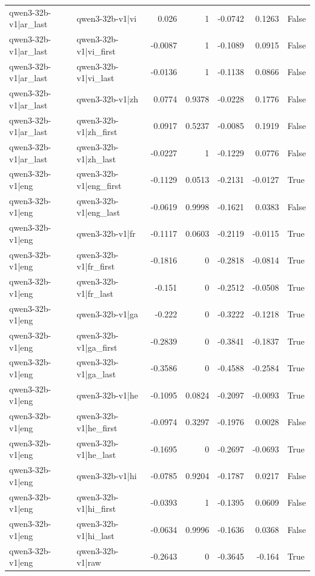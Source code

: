 \begin{table}
\begin{tabular}{l l r r r r l}
qwen3-32b-v1|ar_last & qwen3-32b-v1|vi & 0.026 & 1 & -0.0742 & 0.1263 & False \\
qwen3-32b-v1|ar_last & qwen3-32b-v1|vi_first & -0.0087 & 1 & -0.1089 & 0.0915 & False \\
qwen3-32b-v1|ar_last & qwen3-32b-v1|vi_last & -0.0136 & 1 & -0.1138 & 0.0866 & False \\
qwen3-32b-v1|ar_last & qwen3-32b-v1|zh & 0.0774 & 0.9378 & -0.0228 & 0.1776 & False \\
qwen3-32b-v1|ar_last & qwen3-32b-v1|zh_first & 0.0917 & 0.5237 & -0.0085 & 0.1919 & False \\
qwen3-32b-v1|ar_last & qwen3-32b-v1|zh_last & -0.0227 & 1 & -0.1229 & 0.0776 & False \\
qwen3-32b-v1|eng & qwen3-32b-v1|eng_first & -0.1129 & 0.0513 & -0.2131 & -0.0127 & True \\
qwen3-32b-v1|eng & qwen3-32b-v1|eng_last & -0.0619 & 0.9998 & -0.1621 & 0.0383 & False \\
qwen3-32b-v1|eng & qwen3-32b-v1|fr & -0.1117 & 0.0603 & -0.2119 & -0.0115 & True \\
qwen3-32b-v1|eng & qwen3-32b-v1|fr_first & -0.1816 & 0 & -0.2818 & -0.0814 & True \\
qwen3-32b-v1|eng & qwen3-32b-v1|fr_last & -0.151 & 0 & -0.2512 & -0.0508 & True \\
qwen3-32b-v1|eng & qwen3-32b-v1|ga & -0.222 & 0 & -0.3222 & -0.1218 & True \\
qwen3-32b-v1|eng & qwen3-32b-v1|ga_first & -0.2839 & 0 & -0.3841 & -0.1837 & True \\
qwen3-32b-v1|eng & qwen3-32b-v1|ga_last & -0.3586 & 0 & -0.4588 & -0.2584 & True \\
qwen3-32b-v1|eng & qwen3-32b-v1|he & -0.1095 & 0.0824 & -0.2097 & -0.0093 & True \\
qwen3-32b-v1|eng & qwen3-32b-v1|he_first & -0.0974 & 0.3297 & -0.1976 & 0.0028 & False \\
qwen3-32b-v1|eng & qwen3-32b-v1|he_last & -0.1695 & 0 & -0.2697 & -0.0693 & True \\
qwen3-32b-v1|eng & qwen3-32b-v1|hi & -0.0785 & 0.9204 & -0.1787 & 0.0217 & False \\
qwen3-32b-v1|eng & qwen3-32b-v1|hi_first & -0.0393 & 1 & -0.1395 & 0.0609 & False \\
qwen3-32b-v1|eng & qwen3-32b-v1|hi_last & -0.0634 & 0.9996 & -0.1636 & 0.0368 & False \\
qwen3-32b-v1|eng & qwen3-32b-v1|raw & -0.2643 & 0 & -0.3645 & -0.164 & True \\

\end{tabular}
\end{table}
